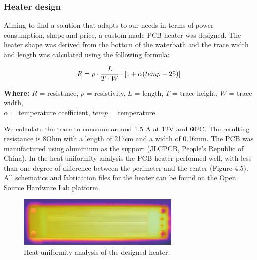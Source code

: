 \subsubsection{Heater design}
Aiming to find a solution that adapts to our needs in terms of power consumption, shape and price, a custom made PCB heater was designed. The heater shape was derived from the bottom of the waterbath and the trace width and length was calculated using the following formula:


\begin{equation*}
\centering
R = \rho \cdot \frac{L}{T \cdot W} \cdot [1 + \alpha (temp -25)]
\end{equation*}
\vspace{12pt}
\begin{center}
    \small{\textbf{Where:} $R$ = resistance, $ρ$ = resistivity, $L$ = length, $T$ = trace height, $W$ = trace width, \\$α$ = temperature coefficient, $temp$ = temperature}
\end{center}
\vspace{12pt}

We calculate the trace to consume around 1.5 A at 12V and 60ºC. The resulting resistance is 8Ohm with a length of 217cm and a width of 0.16mm. The PCB was manufactured using aluminium as the support (JLCPCB, People's Republic of China). In the heat uniformity analysis the PCB heater performed well, with less than one degree of difference between the perimeter and the center (Figure 4.5). All schematics and fabrication files for the heater can be found on the Open Source Hardware Lab platform\cite{francisco_javier_quero_lombardero_lamp_2021}.

\begin{figure}[b]
    \centering
    \includegraphics[width=0.7\textwidth]{figures/heat uniform.png}
    \caption{Heat uniformity analysis of the designed heater.}
    \label{Heat uniformity}
\end{figure}
\newpage


